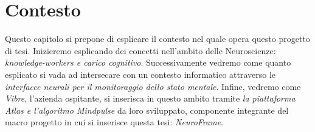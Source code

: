 \chapter{Contesto}
Questo capitolo si prepone di esplicare il contesto nel quale opera questo progetto di tesi.\newline
Inizieremo esplicando dei concetti nell'ambito delle Neuroscienze: \emph{knowledge-workers e carico cognitivo}.\newline
Successivamente vedremo come quanto esplicato si vada ad intersecare con un contesto informatico attraverso le \emph{interfacce neurali per il monitoraggio dello stato mentale}.\newline
Infine, vedremo come \emph{Vibre}, l'azienda ospitante, si inserisca in questo ambito tramite \emph{la piattaforma Atlas e l'algoritmo Mindpulse} da loro sviluppato, componente integrante del macro progetto in cui si inserisce questa tesi: \emph{NeuroFrame}.